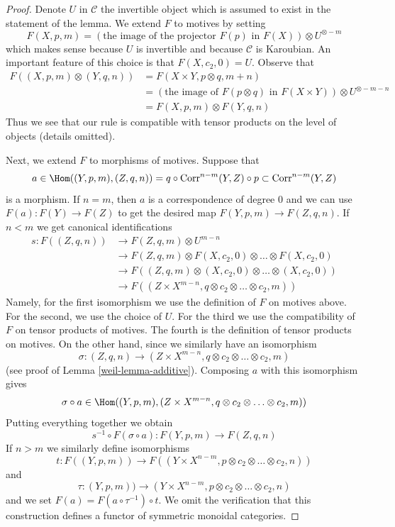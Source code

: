 \begin{proof}

Denote $U$ in $\mathcal{C}$ the invertible object which is assumed to exist
in the statement of the lemma. We extend $F$ to motives by setting
$$
F(X, p, m) = \left(\text{the image of
the projector }F(p)\text{ in }F(X)\right) \otimes U^{\otimes -m}
$$
which makes sense because $U$ is invertible and because $\mathcal{C}$
is Karoubian. An important feature of this choice is that
$F(X, c_2, 0) = U$. Observe that
\begin{align*}
F((X, p, m) \otimes (Y, q, n))
& =
F(X \times Y, p \otimes q, m + n) \\
& =
\left(\text{the image of }F(p \otimes q)\text{ in }F(X \times Y)\right)
\otimes U^{\otimes -m - n} \\
& =
F(X, p, m) \otimes F(Y, q, n)
\end{align*}
Thus we see that our rule is compatible with tensor products on
the level of objects (details omitted).

\medskip\noindent
Next, we extend $F$ to morphisms of motives. Suppose that
$$
a \in
\Hom((Y, p, m), (Z, q, n)) =
q \circ \text{Corr}^{n - m}(Y, Z) \circ p \subset \text{Corr}^{n - m}(Y, Z)
$$
is a morphism. If $n = m$, then $a$ is a correspondence of degree $0$
and we can use $F(a) : F(Y) \to F(Z)$ to get the desired map
$F(Y, p, m) \to F(Z, q, n)$. If $n < m$ we get canonical identifications
\begin{align*}
s : F((Z, q, n))
& \to
F(Z, q, m) \otimes U^{m - n} \\
& \to
F(Z, q, m) \otimes F(X, c_2, 0) \otimes \ldots \otimes F(X, c_2, 0) \\
& \to
F((Z, q, m) \otimes (X, c_2, 0) \otimes \ldots \otimes (X, c_2, 0)) \\
& \to
F((Z \times X^{m - n}, q \otimes c_2 \otimes \ldots \otimes c_2, m))
\end{align*}
Namely, for the first isomorphism we use the definition of $F$ on motives
above. For the second, we use the choice of $U$. For the third we use
the compatibility of $F$ on tensor products of motives. The fourth
is the definition of tensor products on motives. On the other hand, since
we similarly have an isomorphism
$$
\sigma : (Z, q, n) \to
(Z \times X^{m - n}, q \otimes c_2 \otimes \ldots \otimes c_2, m)
$$
(see proof of Lemma \ref{weil-lemma-additive}). Composing $a$ with this isomorphism
gives
$$
\sigma \circ a \in
\Hom((Y, p, m),
(Z \times X^{m - n}, q \otimes c_2 \otimes \ldots \otimes c_2, m))
$$
Putting everything together we obtain
$$
s^{-1} \circ F(\sigma \circ a) :
F(Y, p, m) \to
F(Z, q, n)
$$
If $n > m$ we similarly define isomorphisms
$$
t : F((Y, p, m)) \to
F((Y \times X^{n - m}, p \otimes c_2 \otimes \ldots \otimes c_2, n))
$$
and
$$
\tau : (Y, p, m)) \to
(Y \times X^{n - m}, p \otimes c_2 \otimes \ldots \otimes c_2, n)
$$
and we set $F(a) = F(a \circ \tau^{-1}) \circ t$.
We omit the verification that this construction defines a functor
of symmetric monoidal categories.
\end{proof}

